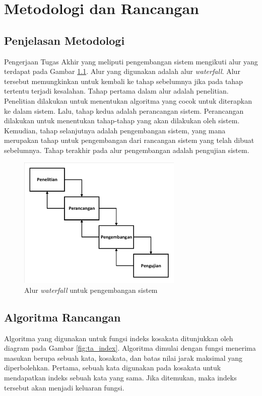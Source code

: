 \chapter{Metodologi dan Rancangan}

\section{Penjelasan Metodologi}

Pengerjaan Tugas Akhir yang meliputi pengembangan sistem mengikuti alur yang terdapat pada Gambar \ref{fig:waterfall}. Alur yang digunakan adalah alur \textit{waterfall}. Alur tersebut memungkinkan untuk kembali ke tahap sebelumnya jika pada tahap tertentu terjadi kesalahan. Tahap pertama dalam alur adalah penelitian. Penelitian dilakukan untuk menentukan algoritma yang cocok untuk diterapkan ke dalam sistem. Lalu, tahap kedua adalah perancangan sistem. Perancangan dilakukan untuk menentukan tahap-tahap yang akan dilakukan oleh sistem. Kemudian, tahap selanjutnya adalah pengembangan sistem, yang mana merupakan tahap untuk pengembangan dari rancangan sistem yang telah dibuat sebelumnya. Tahap terakhir pada alur pengembangan adalah pengujian sistem.

\begin{figure}[H]
	\centering
	\includegraphics[width=0.7\textwidth, trim=2 2 2 2, clip]{resources/3/waterfall.pdf}
	\caption{Alur \textit{waterfall} untuk pengembangan sistem}
	\label{fig:waterfall}
\end{figure}

\section{Algoritma Rancangan}

Algoritma yang digunakan untuk fungsi indeks kosakata ditunjukkan oleh diagram pada Gambar \ref{fig:ta_index}. Algoritma dimulai dengan fungsi menerima masukan berupa sebuah kata, kosakata, dan batas nilai jarak maksimal yang diperbolehkan. Pertama, sebuah kata digunakan pada kosakata untuk mendapatkan indeks sebuah kata yang sama. Jika ditemukan, maka indeks tersebut akan menjadi keluaran fungsi.

